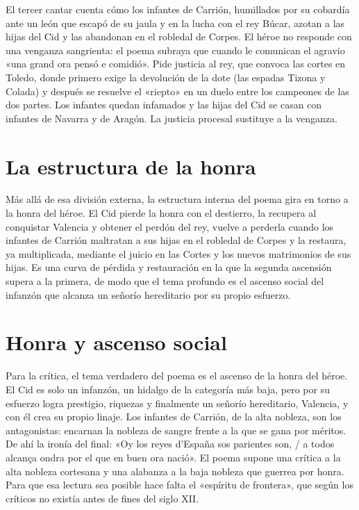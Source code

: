 \documentclass{book}
\begin{document}
El tercer cantar cuenta cómo los infantes de Carrión, humillados por su cobardía ante un león que escapó de su jaula y en la lucha con el rey Búcar, azotan a las hijas del Cid y las abandonan en el robledal de Corpes. El héroe no responde con una venganza sangrienta: el poema subraya que cuando le comunican el agravio «una grand ora pensó e comidió». Pide justicia al rey, que convoca las cortes en Toledo, donde primero exige la devolución de la dote (las espadas Tizona y Colada) y después se resuelve el «riepto» en un duelo entre los campeones de las dos partes. Los infantes quedan infamados y las hijas del Cid se casan con infantes de Navarra y de Aragón. La justicia procesal sustituye a la venganza.


\section{La estructura de la honra}

Más allá de esa división externa, la estructura interna del poema gira en torno a la honra del héroe. El Cid pierde la honra con el destierro, la recupera al conquistar Valencia y obtener el perdón del rey, vuelve a perderla cuando los infantes de Carrión maltratan a sus hijas en el robledal de Corpes y la restaura, ya multiplicada, mediante el juicio en las Cortes y los nuevos matrimonios de sus hijas. Es una curva de pérdida y restauración en la que la segunda ascensión supera a la primera, de modo que el tema profundo es el ascenso social del infanzón que alcanza un señorío hereditario por su propio esfuerzo.


\section{Honra y ascenso social}

Para la crítica, el tema verdadero del poema es el ascenso de la honra del héroe. El Cid es solo un infanzón, un hidalgo de la categoría más baja, pero por su esfuerzo logra prestigio, riquezas y finalmente un señorío hereditario, Valencia, y con él crea su propio linaje. Los infantes de Carrión, de la alta nobleza, son los antagonistas: encarnan la nobleza de sangre frente a la que se gana por méritos. De ahí la ironía del final: «Oy los reyes d'España sos parientes son, / a todos alcança ondra por el que en buen ora nació». El poema supone una crítica a la alta nobleza cortesana y una alabanza a la baja nobleza que guerrea por honra. Para que esa lectura sea posible hace falta el «espíritu de frontera», que según los críticos no existía antes de fines del siglo XII.
\end{document}

